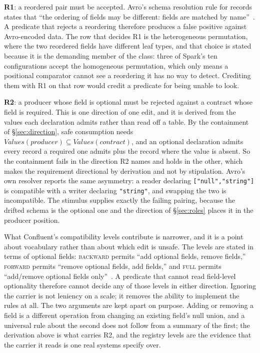 \textbf{R1}: a reordered pair must be accepted. Avro's schema resolution rule for records states that ``the ordering of fields may be different: fields are matched by name''~\cite{avro_spec}. A predicate that rejects a reordering therefore produces a false positive against Avro-encoded data. The row that decides R1 is the heterogeneous permutation, where the two reordered fields have different leaf types, and that choice is stated because it is the demanding member of the class: three of Spark's ten configurations accept the homogeneous permutation, which only means a positional comparator cannot see a reordering it has no way to detect. Crediting them with R1 on that row would credit a predicate for being unable to look.

\textbf{R2}: a producer whose field is optional must be rejected against a contract whose field is required. This is one direction of one edit, and it is derived from the values each declaration admits rather than read off a table. By the containment of \S\ref{sec:direction}, safe consumption needs $\mathit{Values}(\mathit{producer}) \subseteq \mathit{Values}(\mathit{contract})$, and an optional declaration admits every record a required one admits plus the record where the value is absent. So the containment fails in the direction R2 names and holds in the other, which makes the requirement directional by derivation and not by stipulation. Avro's own resolver reports the same asymmetry: a reader declaring \texttt{["null","string"]} is compatible with a writer declaring \texttt{"string"}, and swapping the two is incompatible. The stimulus supplies exactly the failing pairing, because the drifted schema is the optional one and the direction of \S\ref{sec:roles} places it in the producer position.

What Confluent's compatibility levels contribute is narrower, and it is a point about vocabulary rather than about which edit is unsafe. The levels are stated in terms of optional fields: \textsc{backward} permits ``add optional fields, remove fields,'' \textsc{forward} permits ``remove optional fields, add fields,'' and \textsc{full} permits ``add/remove optional fields only''~\cite{avro_compatibility}. A predicate that cannot read field-level optionality therefore cannot decide any of those levels in either direction. Ignoring the carrier is not leniency on a scale; it removes the ability to implement the rules at all. The two arguments are kept apart on purpose. Adding or removing a field is a different operation from changing an existing field's null union, and a universal rule about the second does not follow from a summary of the first; the derivation above is what carries R2, and the registry levels are the evidence that the carrier it reads is one real systems specify over.

